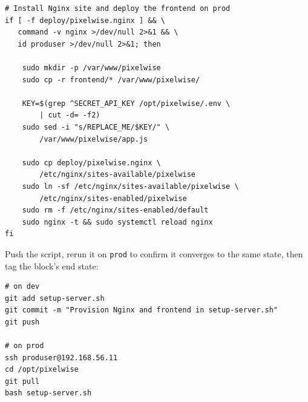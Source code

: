 \begin{verbatim}
# Install Nginx site and deploy the frontend on prod
if [ -f deploy/pixelwise.nginx ] && \
   command -v nginx >/dev/null 2>&1 && \
   id produser >/dev/null 2>&1; then

    sudo mkdir -p /var/www/pixelwise
    sudo cp -r frontend/* /var/www/pixelwise/

    KEY=$(grep ^SECRET_API_KEY /opt/pixelwise/.env \
        | cut -d= -f2)
    sudo sed -i "s/REPLACE_ME/$KEY/" \
        /var/www/pixelwise/app.js

    sudo cp deploy/pixelwise.nginx \
        /etc/nginx/sites-available/pixelwise
    sudo ln -sf /etc/nginx/sites-available/pixelwise \
        /etc/nginx/sites-enabled/pixelwise
    sudo rm -f /etc/nginx/sites-enabled/default
    sudo nginx -t && sudo systemctl reload nginx
fi
\end{verbatim}


\newthought{Commit, push, run, tag.}
Push the script, rerun it on \texttt{prod} to confirm it converges to
the same state, then tag the block's end state:

\begin{verbatim}
# on dev
git add setup-server.sh
git commit -m "Provision Nginx and frontend in setup-server.sh"
git push

# on prod
ssh produser@192.168.56.11
cd /opt/pixelwise
git pull
bash setup-server.sh
\end{verbatim}


\newpage
